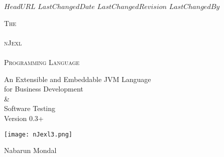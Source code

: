 \svnidlong
{$HeadURL$}
{$LastChangedDate$}
{$LastChangedRevision$}
{$LastChangedBy$}

\thispagestyle{titlepage}

\begin{center}
  \newlength{\parSepLength}
  \setlength{\parSepLength}{10ex}

  \Large
  \centering

  \thinRule\par
  \par\vspace{0.45\parSepLength}
  \begin{minipage}{\textwidth}
    \centering
    \fontsize{40pt}{30pt}\selectfont\titleColor\scshape
    The \\ ~ \\ nJexl \\ ~ \\ Programming Language  
  \end{minipage}
  \par\vspace{0.45\parSepLength}
  \par\thinRule

  \vspace{0.125\parSepLength}

  \begin{minipage}{\textwidth}
    \centering
    An Extensible and Embeddable JVM Language \\ for Business Development \\ \& \\ Software Testing \\
    Version 0.3+
  \end{minipage}

  \vfill
 
  \begin{minipage}{0.8\textwidth}
    \centering
    \texttt{[image: nJexl3.png]}
  \end{minipage}

 \vfill
 
  \begin{minipage}{\textwidth}
    \centering
    \Large
    Nabarun Mondal 
  \end{minipage}

  \vfill

 
\end{center}
